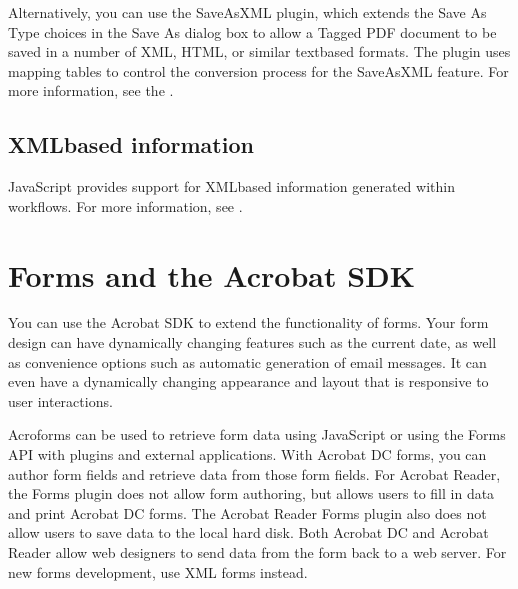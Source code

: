 \documentclass[letterpaper,12pt,english,openany,oneside]{sphinxmanual}
\begin{document}
Alternatively, you can use the SaveAsXML plug\sphinxhyphen{}in, which extends the Save As Type choices in the Save As dialog box to allow a Tagged PDF document to be saved in a number of XML, HTML, or similar text\sphinxhyphen{}based formats. The plug\sphinxhyphen{}in uses mapping tables to control the conversion process for the SaveAsXML feature. For more information, see the  .




\section{XML\sphinxhyphen{}based information}
\label{\detokenize{Overview_XML:xml-based-information}}
JavaScript provides support for XML\sphinxhyphen{}based information generated within workflows. For more information, see  .


\chapter{Forms and the Acrobat SDK}
\label{\detokenize{Overview_Forms:forms-and-the-acrobat-sdk}}\label{\detokenize{Overview_Forms::doc}}
You can use the Acrobat SDK to extend the functionality of forms. Your form design can have dynamically changing features such as the current date, as well as convenience options such as automatic generation of e\sphinxhyphen{}mail messages. It can even have a dynamically changing appearance and layout that is responsive to user interactions.

Acroforms can be used to retrieve form data using JavaScript or using the Forms API with plug\sphinxhyphen{}ins and external applications. With Acrobat DC forms, you can author form fields and retrieve data from those form fields. For Acrobat Reader, the Forms plug\sphinxhyphen{}in does not allow form authoring, but allows users to fill in data and print Acrobat DC forms. The Acrobat Reader Forms plug\sphinxhyphen{}in also does not allow users to save data to the local hard disk. Both Acrobat DC and Acrobat Reader allow web designers to send data from the form back to a web server. For new forms development, use XML forms instead.
\end{document}
